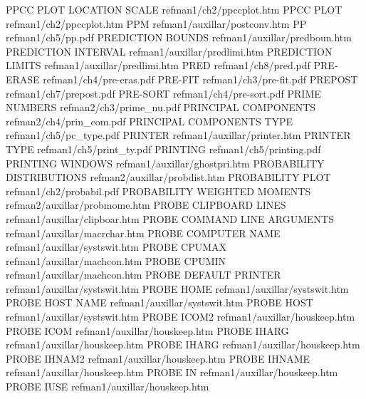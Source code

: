 PPCC PLOT LOCATION SCALE                refman1/ch2/ppccplot.htm
PPCC PLOT                               refman1/ch2/ppccplot.htm
PPM                                     refman1/auxillar/postconv.htm
PP                                      refman1/ch5/pp.pdf
PREDICTION BOUNDS                       refman1/auxillar/predboun.htm
PREDICTION INTERVAL                     refman1/auxillar/predlimi.htm
PREDICTION LIMITS                       refman1/auxillar/predlimi.htm
PRED                                    refman1/ch8/pred.pdf
PRE-ERASE                               refman1/ch4/pre-eras.pdf
PRE-FIT                                 refman1/ch3/pre-fit.pdf
PREPOST                                 refman1/ch7/prepost.pdf
PRE-SORT                                refman1/ch4/pre-sort.pdf
PRIME NUMBERS                           refman2/ch3/prime_nu.pdf
PRINCIPAL COMPONENTS                    refman2/ch4/prin_com.pdf
PRINCIPAL COMPONENTS TYPE               refman1/ch5/pc_type.pdf
PRINTER                                 refman1/auxillar/printer.htm
PRINTER TYPE                            refman1/ch5/print_ty.pdf
PRINTING                                refman1/ch5/printing.pdf
PRINTING WINDOWS                        refman1/auxillar/ghostpri.htm
PROBABILITY DISTRIBUTIONS               refman2/auxillar/probdist.htm
PROBABILITY PLOT                        refman1/ch2/probabil.pdf
PROBABILITY WEIGHTED MOMENTS            refman2/auxillar/probmome.htm
PROBE CLIPBOARD LINES                   refman1/auxillar/clipboar.htm
PROBE COMMAND LINE ARGUMENTS            refman1/auxillar/macrchar.htm
PROBE COMPUTER NAME                     refman1/auxillar/systswit.htm
PROBE CPUMAX                            refman1/auxillar/machcon.htm
PROBE CPUMIN                            refman1/auxillar/machcon.htm
PROBE DEFAULT PRINTER                   refman1/auxillar/systswit.htm
PROBE HOME                              refman1/auxillar/systswit.htm
PROBE HOST NAME                         refman1/auxillar/systswit.htm
PROBE HOST                              refman1/auxillar/systswit.htm
PROBE ICOM2                             refman1/auxillar/houskeep.htm
PROBE ICOM                              refman1/auxillar/houskeep.htm
PROBE IHARG                             refman1/auxillar/houskeep.htm
PROBE IHARG                             refman1/auxillar/houskeep.htm
PROBE IHNAM2                            refman1/auxillar/houskeep.htm
PROBE IHNAME                            refman1/auxillar/houskeep.htm
PROBE IN                                refman1/auxillar/houskeep.htm
PROBE IUSE                              refman1/auxillar/houskeep.htm
